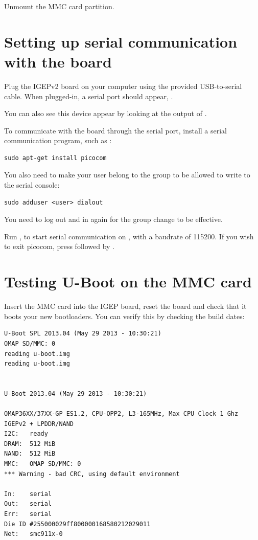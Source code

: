 Unmount the MMC card partition.

\section{Setting up serial communication with the board}

Plug the IGEPv2 board on your computer using the provided
USB-to-serial cable. When plugged-in, a serial port should appear,
.

You can also see this device appear by looking at the output of
.

To communicate with the board through the serial port, install a
serial communication program, such as :

\begin{verbatim}
sudo apt-get install picocom
\end{verbatim}

You also need to make your user belong to the  group to be
allowed to write to the serial console:

\begin{verbatim}
sudo adduser <user> dialout
\end{verbatim}

You need to log out and in again for the group change to be effective.

Run , to start serial
communication on , with a baudrate of 115200. If
you wish to exit picocom, press \code{[Ctrl][a]} followed by
\code{[Ctrl][x]}.

\section{Testing U-Boot on the MMC card}

Insert the MMC card into the IGEP board, reset the board and check
that it boots your new bootloaders. You can verify this by checking
the build dates:

\begin{verbatim}
U-Boot SPL 2013.04 (May 29 2013 - 10:30:21)
OMAP SD/MMC: 0
reading u-boot.img
reading u-boot.img


U-Boot 2013.04 (May 29 2013 - 10:30:21)

OMAP36XX/37XX-GP ES1.2, CPU-OPP2, L3-165MHz, Max CPU Clock 1 Ghz
IGEPv2 + LPDDR/NAND
I2C:   ready
DRAM:  512 MiB
NAND:  512 MiB
MMC:   OMAP SD/MMC: 0
*** Warning - bad CRC, using default environment

In:    serial
Out:   serial
Err:   serial
Die ID #255000029ff800000168580212029011
Net:   smc911x-0
\end{verbatim}

